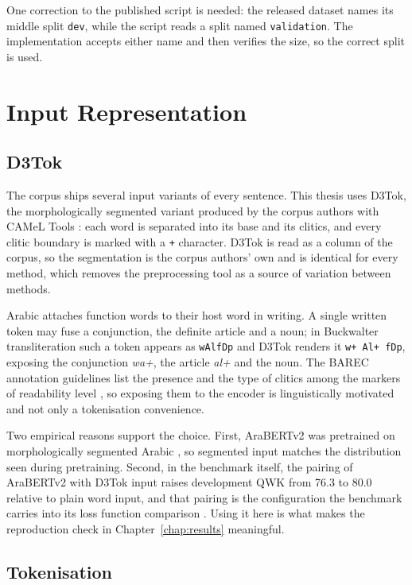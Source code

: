 One correction to the published script is needed: the released dataset names its middle split
\texttt{dev}, while the script reads a split named \texttt{validation}. The implementation
accepts either name and then verifies the size, so the correct split is used.

\section{Input Representation}
\label{sec:meth-input}

\subsection{D3Tok}

The corpus ships several input variants of every sentence. This thesis uses D3Tok, the
morphologically segmented variant produced by the corpus authors with CAMeL Tools
\cite{obeid2020camel}: each word is separated into its base and its clitics, and every clitic
boundary is marked with a \texttt{+} character. D3Tok is read as a column of the corpus, so the
segmentation is the corpus authors' own and is identical for every method, which removes the
preprocessing tool as a source of variation between methods.

Arabic attaches function words to their host word in writing. A single written token may fuse a
conjunction, the definite article and a noun; in Buckwalter transliteration such a token
appears as \texttt{wAlfDp} and D3Tok renders it \texttt{w+ Al+ fDp}, exposing the conjunction
\textit{wa+}, the article \textit{al+} and the noun. The BAREC annotation guidelines list the
presence and the type of clitics among the markers of readability level
\cite{habash2025guidelines}, so exposing them to the encoder is linguistically motivated and
not only a tokenisation convenience.

Two empirical reasons support the choice. First, AraBERTv2 was pretrained on morphologically
segmented Arabic \cite{antoun2020arabert}, so segmented input matches the distribution seen
during pretraining. Second, in the benchmark itself, the pairing of AraBERTv2 with D3Tok input
raises development QWK from 76.3 to 80.0 relative to plain word input, and that pairing is the
configuration the benchmark carries into its loss function comparison
\cite{elmadani2025barec}. Using it here is what makes the reproduction check in
Chapter~\ref{chap:results} meaningful.

\subsection{Tokenisation}

